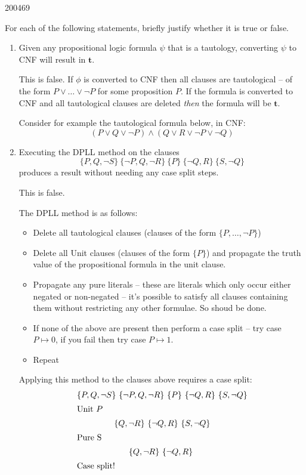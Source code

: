 \documentclass[10pt,\jkfside,a4paper]{article}
\begin{document}
\begin{examquestion}{2004}{6}{9}

For each of the following statements, briefly justify whether it is true or
false.

\begin{enumerate}

\item Given any propositional logic formula $\psi$ that is a tautology,
converting $\psi$ to CNF will result in $\mathbf{t}$.

This is false. If $\phi$ is converted to CNF then all clauses are
tautological -- of the form $P \vee \dots \vee \neg P$ for some proposition
$P$. If the formula is converted to CNF and all tautological clauses are
deleted \textit{then} the formula will be $\mathbf{t}$.

Consider for example the tautological formula below, in CNF:
\[
(P \vee Q \vee \neg P) \wedge (Q \vee R \vee \neg P \vee \neg Q)
\]

\item Executing the DPLL method on the clauses
\[
\{P, Q, \neg S\}\ \{\neg P, Q, \neg R\}\ \{P\}\ \{\neg Q, R \}\ \{S, \neg Q\}
\]
produces a result without needing any case split steps.

This is false.

The DPLL method is as follows:
\begin{itemize}

\item Delete all tautological clauses (clauses of the form $\{P, \dots, \neg P\}$)

\item Delete all Unit clauses (clauses of the form $\{P\}$) and propagate the
truth value of the propositional formula in the unit clause.

\item Propagate any pure literals -- these are literals which only occur
either negated or non-negated -- it's possible to satisfy all clauses
containing them without restricting any other formulae. So shoud be done.

\item If none of the above are present then perform a case split -- try
case $P \mapsto 0$, if you fail then try case $P\mapsto 1$.

\item Repeat

\end{itemize}

Applying this method to the clauses above requires a case split:
\begin{gather*}
\{P, Q, \neg S\}\ \{\neg P, Q, \neg R\}\ \{P\}\ \{\neg Q, R \}\ \{S, \neg
Q\} \\
\intertext{Unit $P$}
\{Q, \neg R\}\ \{\neg Q, R \}\ \{S, \neg Q\} \\
\intertext{Pure S}
\{Q, \neg R\}\ \{\neg Q, R \}\ \\
\intertext{Case split!}
\end{gather*}


\end{enumerate}
\end{examquestion}
\end{document}
